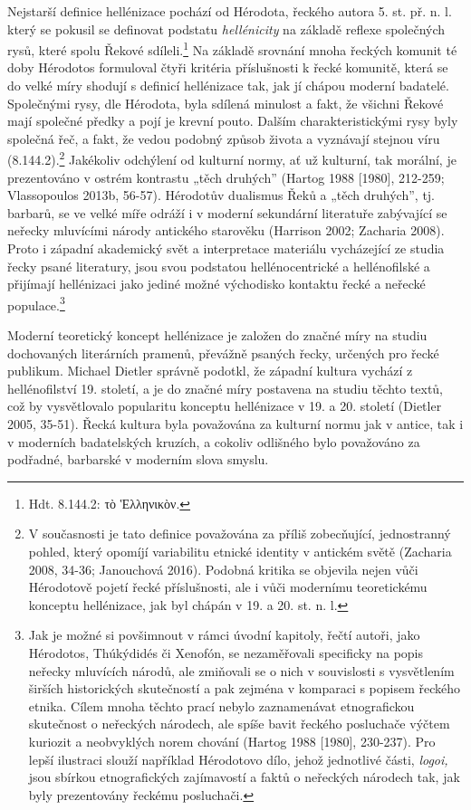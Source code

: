 Nejstarší definice hellénizace pochází od Hérodota, řeckého autora 5. st. př. n. l. který se pokusil se definovat podstatu {\em hellénicity} na základě reflexe společných rysů, které spolu Řekové sdíleli.\footnote{Hdt. 8.144.2: τὸ Ἑλληνικὸν.} Na základě srovnání mnoha řeckých komunit té doby Hérodotos formuloval čtyři kritéria příslušnosti k řecké komunitě, která se do velké míry shodují s definicí hellénizace tak, jak jí chápou moderní badatelé. Společnými rysy, dle Hérodota, byla sdílená minulost a fakt, že všichni Řekové mají společné předky a pojí je krevní pouto. Dalším charakteristickými rysy byly společná řeč, a fakt, že vedou podobný způsob života a vyznávají stejnou víru (8.144.2).\footnote{V současnosti je tato definice považována za příliš zobecňující, jednostranný pohled, který opomíjí variabilitu etnické identity v antickém světě (Zacharia 2008, 34-36; Janouchová 2016). Podobná kritika se objevila nejen vůči Hérodotově pojetí řecké příslušnosti, ale i vůči modernímu teoretickému konceptu hellénizace, jak byl chápán v 19. a 20. st. n. l.} Jakékoliv odchýlení od kulturní normy, ať už kulturní, tak morální, je prezentováno v ostrém kontrastu „těch druhých” (Hartog 1988 {[}1980{]}, 212-259; Vlassopoulos 2013b, 56-57). Hérodotův dualismus Řeků a „těch druhých”, tj. barbarů, se ve velké míře odráží i v moderní sekundární literatuře zabývající se neřecky mluvícími národy antického starověku (Harrison 2002; Zacharia 2008). Proto i západní akademický svět a interpretace materiálu vycházející ze studia řecky psané literatury, jsou svou podstatou hellénocentrické a hellénofilské a přijímají hellénizaci jako jediné možné východisko kontaktu řecké a neřecké populace.\footnote{Jak je možné si povšimnout v rámci úvodní kapitoly, řečtí autoři, jako Hérodotos, Thúkýdidés či Xenofón, se nezaměřovali specificky na popis neřecky mluvících národů, ale zmiňovali se o nich v souvislosti s vysvětlením širších historických skutečností a pak zejména v komparaci s popisem řeckého etnika. Cílem mnoha těchto prací nebylo zaznamenávat etnografickou skutečnost o neřeckých národech, ale spíše bavit řeckého posluchače výčtem kuriozit a neobvyklých norem chování (Hartog 1988 {[}1980{]}, 230-237). Pro lepší ilustraci slouží například Hérodotovo dílo, jehož jednotlivé části, {\em logoi,} jsou sbírkou etnografických zajímavostí a faktů o neřeckých národech tak, jak byly prezentovány řeckému posluchači.}

Moderní teoretický koncept hellénizace je založen do značné míry na studiu dochovaných literárních pramenů, převážně psaných řecky, určených pro řecké publikum. Michael Dietler správně podotkl, že západní kultura vychází z hellénofilství 19. století, a je do značné míry postavena na studiu těchto textů, což by vysvětlovalo popularitu konceptu hellénizace v 19. a 20. století (Dietler 2005, 35-51). Řecká kultura byla považována za kulturní normu jak v antice, tak i v moderních badatelských kruzích, a cokoliv odlišného bylo považováno za podřadné, barbarské v moderním slova smyslu.

